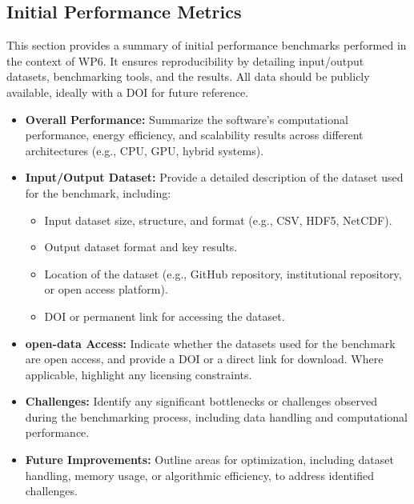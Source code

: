 \subsection{Initial Performance Metrics}
\label{sec:WP6:Uranie:metrics}

This section provides a summary of initial performance benchmarks performed in the context of WP6. It ensures reproducibility by detailing input/output datasets, benchmarking tools, and the results. All data should be publicly available, ideally with a DOI for future reference.

\begin{itemize}
    \item \textbf{Overall Performance:} Summarize the software's computational performance, energy efficiency, and scalability results across different architectures (e.g., CPU, GPU, hybrid systems).
    \item \textbf{Input/Output Dataset:} Provide a detailed description of the dataset used for the benchmark, including:
        \begin{itemize}
            \item Input dataset size, structure, and format (e.g., CSV, HDF5, NetCDF).
            \item Output dataset format and key results.
            \item Location of the dataset (e.g., GitHub repository, institutional repository, or open access platform).
            \item DOI or permanent link for accessing the dataset.
        \end{itemize}
    \item \textbf{open-data Access:} Indicate whether the datasets used for the benchmark are open access, and provide a DOI or a direct link for download. Where applicable, highlight any licensing constraints.
    \item \textbf{Challenges:} Identify any significant bottlenecks or challenges observed during the benchmarking process, including data handling and computational performance.
    \item \textbf{Future Improvements:} Outline areas for optimization, including dataset handling, memory usage, or algorithmic efficiency, to address identified challenges.
\end{itemize}

